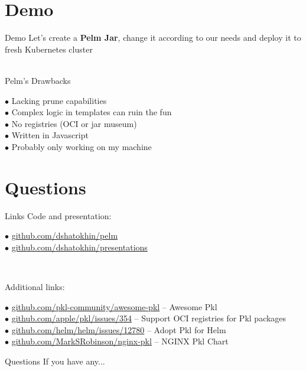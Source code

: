 \documentclass[11pt, aspectratio=169]{beamer}
\begin{document}
\section{Demo}

\begin{frame}{ Demo}
	Let's create a \textbf{Pelm Jar}, change it according to our needs
	and deploy it to fresh Kubernetes cluster\\~\\
	\centerline{{\Huge {}}}
\end{frame}

\begin{frame}{ Pelm's Drawbacks}
	\begin{description}
		\item [$\bullet$ Lacking prune capabilities]
		\item [$\bullet$ Complex logic in templates can ruin the fun]
		\item [$\bullet$ No registries (OCI or jar museum)]
		\item [$\bullet$ Written in Javascript]
		\item [$\bullet$ Probably only working on my machine]
	\end{description}
\end{frame}

\section{Questions}

\begin{frame}{ Links}
	Code and presentation:
	\begin{description}
		\item [$\bullet$ \href{https://github.com/dshatokhin/pelm}{github.com/dshatokhin/pelm}]
		\item [$\bullet$ \href{https://github.com/dshatokhin/presentations}{github.com/dshatokhin/presentations}]
	\end{description}~

	Additional links:
	\begin{description}
		\item [$\bullet$ \href{https://github.com/pkl-community/awesome-pkl}{github.com/pkl-community/awesome-pkl}
		      -- Awesome Pkl]
		\item [$\bullet$ \href{https://github.com/apple/pkl/issues/354}{github.com/apple/pkl/issues/354}
		      -- Support OCI registries for Pkl packages]
		\item [$\bullet$ \href{https://github.com/helm/helm/issues/12780}{github.com/helm/helm/issues/12780}
		      -- Adopt Pkl for Helm]
		\item [$\bullet$ \href{https://github.com/MarkSRobinson/nginx-pkl}{github.com/MarkSRobinson/nginx-pkl}
		      -- NGINX Pkl Chart]
	\end{description}
\end{frame}

\begin{frame}{ Questions}
	If you have any...
\end{frame}
\end{document}
